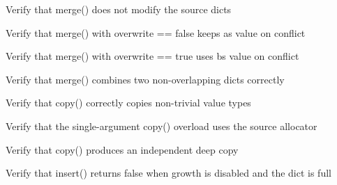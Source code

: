 \begin{DoxyRefList}
%
Verify that merge() does not modify the source dicts  
\item[Global \doxylink{test__dict_8cpp_a31bbc21ed09c92ed8c3f59f91ae3e8b4}{TEST\+\_\+F} (\doxylink{classDictTest}{Dict\+Test}, Merge\+Overwrite\+False\+AWins)]\label{test__test000259}%
%
Verify that merge() with overwrite == false keeps a\textquotesingle{}s value on conflict  
\item[Global \doxylink{test__dict_8cpp_a558c877000fd09d5c1b07f8329bc98ca}{TEST\+\_\+F} (\doxylink{classDictTest}{Dict\+Test}, Merge\+Overwrite\+True\+BWins)]\label{test__test000258}%
%
Verify that merge() with overwrite == true uses b\textquotesingle{}s value on conflict  
\item[Global \doxylink{test__dict_8cpp_adfe30ffcc8824b2411d409027590ac58}{TEST\+\_\+F} (\doxylink{classDictTest}{Dict\+Test}, Merge\+Non\+Overlapping\+Dicts)]\label{test__test000257}%
%
Verify that merge() combines two non-\/overlapping dicts correctly  
\item[Global \doxylink{test__dict_8cpp_aa202c22afd12c4b6df57fc27e4a486d6}{TEST\+\_\+F} (\doxylink{classDictTest}{Dict\+Test}, Copy\+Non\+Trivial\+Value\+Succeeds)]\label{test__test000256}%
%
Verify that copy() correctly copies non-\/trivial value types  
\item[Global \doxylink{test__dict_8cpp_aefccdc7d241a8880175ce26bceca1c39}{TEST\+\_\+F} (\doxylink{classDictTest}{Dict\+Test}, Copy\+One\+Arg\+Overload\+Succeeds)]\label{test__test000255}%
%
Verify that the single-\/argument copy() overload uses the source allocator  
\item[Global \doxylink{test__dict_8cpp_a899eeae1e9be0147a1ab1c6a1ce030f9}{TEST\+\_\+F} (\doxylink{classDictTest}{Dict\+Test}, Copy\+Produces\+Independent\+Dict)]\label{test__test000254}%
%
Verify that copy() produces an independent deep copy  
\item[Global \doxylink{test__dict_8cpp_a38926ad517462ba7ce15c31158d8fdae}{TEST\+\_\+F} (\doxylink{classDictTest}{Dict\+Test}, Insert\+Fails\+When\+Full\+And\+Growth\+Disabled)]\label{test__test000225}%
%
Verify that insert() returns false when growth is disabled and the dict is full  
\item[Global \doxylink{test__dict_8cpp_aa987aaa56724fe977a207d8fb8cd08cc}{TEST\+\_\+F} (\doxylink{classDictTest}{Dict\+Test}, Foreach\+Visits\+All\+Pairs)]\label{test__test000251}%

\end{DoxyRefList}
